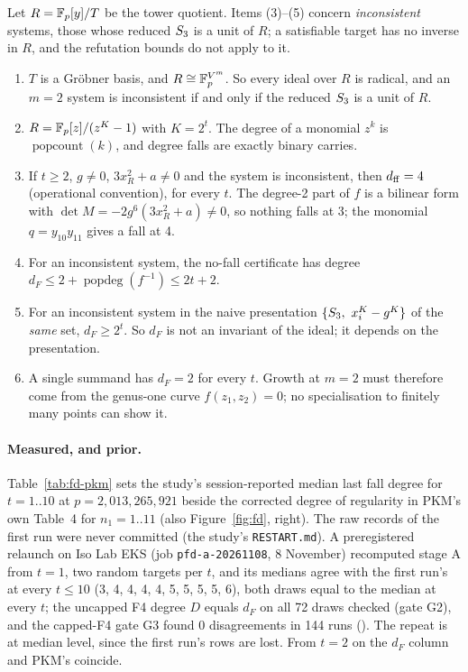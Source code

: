 \begin{theorem}[Kummer towers, $m=2$]\label{thm:pkm}
Let $R=\mathbb{F}_p[y]/T$ be the tower quotient. Items (3)--(5) concern
\emph{inconsistent} systems, those whose reduced $S_{3}$ is a unit of $R$; a
satisfiable target has no inverse in $R$, and the refutation bounds do not
apply to it.
\begin{enumerate}
\item $T$ is a Gröbner basis, and $R\cong\mathbb{F}_p^{V^m}$. So every ideal
  over $R$ is radical, and an $m=2$ system is inconsistent if and only if
  the reduced $S_{3}$ is a unit of $R$.
\item $R=\mathbb{F}_p[z]/(z^K-1)$ with $K=2^t$. The degree of a monomial $z^k$ is
  $\operatorname{popcount}(k)$, and degree falls are exactly binary
  carries.
\item If $t\ge2$, $g\ne0$, $3x_R^2+a\ne0$ and the system is inconsistent, then $d_{\rm ff}=4$
  (operational convention), for every $t$. The degree-2 part of $f$ is a
  bilinear form with $\det M=-2g^6(3x_R^2+a)\ne0$, so nothing falls at 3;
  the monomial $q=y_{10}y_{11}$ gives a fall at 4.
\item For an inconsistent system, the no-fall certificate has degree
  $d_F\le2+\operatorname{popdeg}(f^{-1})\le2t+2$.
\item For an inconsistent system in the naive presentation
  $\{S_{3},\ x_i^K-g^K\}$ of the \emph{same} set, $d_F\ge2^t$. So $d_F$ is not an invariant of the ideal; it depends
  on the presentation.
\item A single summand has $d_F=2$ for every $t$. Growth at $m=2$ must
  therefore come from the genus-one curve $f(z_1,z_2)=0$; no
  specialisation to finitely many points can show it.
\end{enumerate}
\end{theorem}

\paragraph{Measured, and prior.} Table~\ref{tab:fd-pkm} sets the study's
session-reported median last fall degree for $t=1..10$ at
$p=2{,}013{,}265{,}921$ beside the corrected degree of regularity in PKM's
own Table~4 for $n_1=1..11$ (also Figure~\ref{fig:fd}, right). The raw
records of the first run were never committed (the study's
\texttt{RESTART.md}). A preregistered relaunch on Iso Lab EKS (job
\texttt{pfd-a-20261108}, 8 November) recomputed stage A from $t=1$, two
random targets per $t$, and its medians agree with the first run's at every
$t\le10$ (3, 4, 4, 4, 4, 5, 5, 5, 5, 6), both draws equal to the median at
every $t$; the uncapped F4 degree $D$ equals $d_F$ on all 72 draws checked
(gate G2), and the capped-F4 gate G3 found 0 disagreements in 144 runs
(). The repeat is
at median level, since the first run's rows are lost. From $t=2$ on the
$d_F$ column and PKM's coincide.

